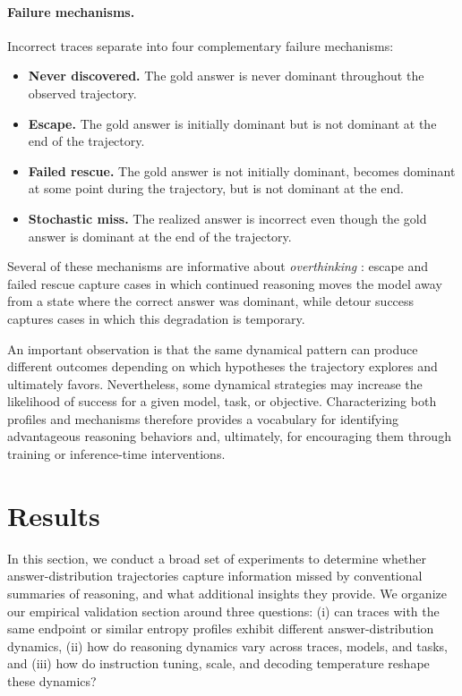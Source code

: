 \documentclass{article}
\begin{document}
\paragraph{Failure mechanisms.}
Incorrect traces separate into four complementary failure mechanisms:
\begin{itemize}
    \item \textbf{Never discovered.} The gold answer is never dominant throughout the observed trajectory.
    \item \textbf{Escape.} The gold answer is initially dominant but is not dominant at the end of the trajectory.
    \item \textbf{Failed rescue.} The gold answer is not initially dominant, becomes dominant at some point during the trajectory, but is not dominant at the end.
    \item \textbf{Stochastic miss.} The realized answer is incorrect even though the gold answer is dominant at the end of the trajectory.
\end{itemize}

Several of these mechanisms are informative about \textit{overthinking} \cite{pmlr-v267-chen25bx, zhou-etal-2026-thinking, caldarella2026thinkingpastanswerevaluating}: escape and failed rescue capture cases in which continued reasoning moves the model away from a state where the correct answer was dominant, while detour success captures cases in which this degradation is temporary.

An important observation is that the same dynamical pattern can produce different outcomes depending on which hypotheses the trajectory explores and ultimately favors. Nevertheless, some dynamical strategies may increase the likelihood of success for a given model, task, or objective. Characterizing both profiles and mechanisms therefore provides a vocabulary for identifying advantageous reasoning behaviors and, ultimately, for encouraging them through training or inference-time interventions.

\section{Results}

In this section, we conduct a broad set of experiments to determine whether answer-distribution trajectories capture information missed by conventional summaries of reasoning, and what additional insights they provide. We organize our empirical validation section around three questions: (i) can traces with the same endpoint or similar entropy profiles exhibit different answer-distribution dynamics, (ii) how do reasoning dynamics vary across traces, models, and tasks, and (iii) how do instruction tuning, scale, and decoding temperature reshape these dynamics?
\end{document}
